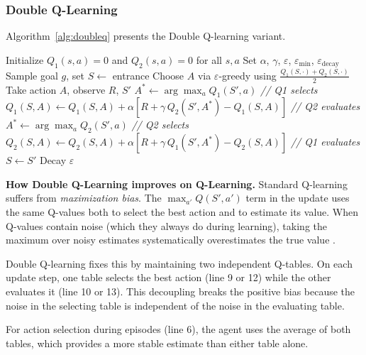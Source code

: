 \documentclass[letterpaper]{article}
\begin{document}
\subsubsection{Double Q-Learning}

Algorithm~\ref{alg:doubleq} presents the Double Q-learning variant.

\begin{algorithm}[t]
\caption{Double Q-Learning}
\label{alg:doubleq}
\begin{algorithmic}[1]
\STATE Initialize $Q_1(s, a) = 0$ and $Q_2(s, a) = 0$ for all $s, a$
\STATE Set $\alpha$, $\gamma$, $\varepsilon$, $\varepsilon_{\min}$, $\varepsilon_{\text{decay}}$
    \STATE Sample goal $g$, set $S \leftarrow$ entrance
        \STATE Choose $A$ via $\varepsilon$-greedy using $\frac{Q_1(S,\cdot) + Q_2(S,\cdot)}{2}$
        \STATE Take action $A$, observe $R$, $S'$
            \STATE $A^* \leftarrow \arg\max_a Q_1(S', a)$ \hfill \textit{// Q1 selects}
            \STATE $Q_1(S,A) \leftarrow Q_1(S,A) + \alpha[R + \gamma\, Q_2(S', A^*) - Q_1(S,A)]$ \hfill \textit{// Q2 evaluates}
        \ELSE
            \STATE $A^* \leftarrow \arg\max_a Q_2(S', a)$ \hfill \textit{// Q2 selects}
            \STATE $Q_2(S,A) \leftarrow Q_2(S,A) + \alpha[R + \gamma\, Q_1(S', A^*) - Q_2(S,A)]$ \hfill \textit{// Q1 evaluates}
        \ENDIF
        \STATE $S \leftarrow S'$
    \ENDWHILE
    \STATE Decay $\varepsilon$
\ENDFOR
\end{algorithmic}
\end{algorithm}

\textbf{How Double Q-Learning improves on Q-Learning.} Standard Q-learning suffers from \textit{maximization bias}. The $\max_{a'} Q(S', a')$ term in the update uses the same Q-values both to select the best action and to estimate its value. When Q-values contain noise (which they always do during learning), taking the maximum over noisy estimates systematically overestimates the true value \citep{hasselt2010double}.

Double Q-learning fixes this by maintaining two independent Q-tables. On each update step, one table selects the best action (line 9 or 12) while the other evaluates it (line 10 or 13). This decoupling breaks the positive bias because the noise in the selecting table is independent of the noise in the evaluating table.

For action selection during episodes (line 6), the agent uses the average of both tables, which provides a more stable estimate than either table alone.
\end{document}
